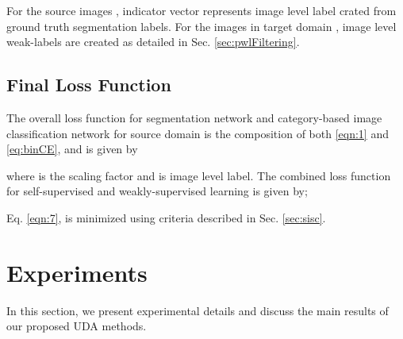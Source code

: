 \documentclass[10pt,twocolumn,letterpaper]{article}
\begin{document}
For the source images , indicator vector  represents image level label crated from ground truth segmentation labels. For the images in target domain , image level weak-labels  are created as detailed in Sec. \ref{sec:pwlFiltering}. 



\subsection{Final Loss Function}

The overall loss function for segmentation network and category-based image classification network for source domain is the composition of both \ref{eqn:1} and \ref{eq:binCE}, and is given by 

where  is the scaling factor and  is image level label. 
The combined loss function for self-supervised and weakly-supervised learning is given by;

Eq. \ref{eqn:7}, is minimized using criteria described in Sec. \ref{sec:sisc}.
\section{Experiments}
\label{sec:exp}
In this section, we present experimental details and discuss the main results of our proposed UDA methods.
\end{document}
